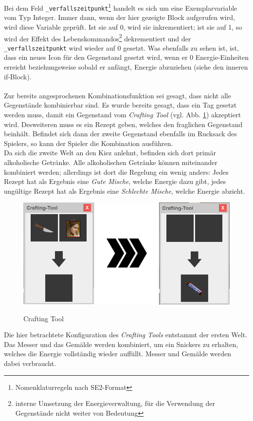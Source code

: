 \documentclass[12pt,twoside]{article}
\theoremstyle{plain}
\theoremstyle{definition}
\theoremstyle{remark}
\begin{document}
Bei dem Feld \texttt{\_verfallszeitpunkt}\footnote{Nomenklaturregeln nach SE2-Format} handelt es sich um eine Exemplarvariable vom Typ Integer.
Immer dann, wenn der hier gezeigte Block aufgerufen wird, wird diese Variable geprüft.
Ist sie auf 0, wird sie inkrementiert; ist sie auf 1, so wird der Effekt des Lebenskommandos\footnote{interne Umsetzung der Energieverwaltung, für die Verwendung der Gegenstände nicht weiter von Bedeutung} dekrementiert und der \texttt{\_verfallszeitpunkt} wird wieder auf 0 gesetzt.
Was ebenfalls zu sehen ist, ist, dass ein neues Icon für den Gegenstand gesetzt wird, wenn er 0 Energie-Einheiten erreicht beziehungsweise sobald er anfängt, Energie abzuziehen (siehe den inneren if-Block).\\
\\
Zur bereits angesprochenen Kombinationsfunktion sei gesagt, dass nicht alle Gegenstände kombinierbar sind.
Es wurde bereits gesagt, dass ein Tag gesetzt werden muss, damit ein Gegenstand vom \textit{Crafting Tool} (vgl. Abb. \ref{fig:main_craft}) akzeptiert wird.
Desweiteren muss es ein Rezept geben, welches den fraglichen Gegenstand beinhält.
Befindet sich dann der zweite Gegenstand ebenfalls im Rucksack des Spielers, so kann der Spieler die Kombination ausführen.\\
Da sich die zweite Welt an den Kiez anlehnt, befinden sich dort primär alkoholische Getränke.
Alle alkoholischen Getränke können miteinander kombiniert werden; allerdings ist dort die Regelung ein wenig anders: Jedes Rezept hat als Ergebnis eine \textit{Gute Mische}, welche Energie dazu gibt, jedes ungültige Rezept hat als Ergebnis eine \textit{Schlechte Mische}, welche Energie abzieht.
\begin{figure}[h!bt]
    \begin{center}
        \includegraphics[scale=0.5]{craftingUI.png}
        \label{fig:main_craft}
    	\caption{Crafting Tool}
    \end{center}
\end{figure}
Die hier betrachtete Konfiguration des \textit{Crafting Tools} entstammt der ersten Welt.
Das Messer und das Gemälde werden kombiniert, um ein Snickers zu erhalten, welches die Energie vollständig wieder auffüllt.
Messer und Gemälde werden dabei verbraucht.
\end{document}
